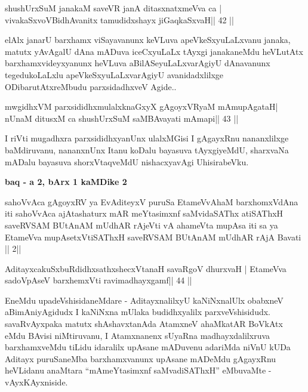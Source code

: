 \begin{shl}
shushUrxSuM janakaM saveVR janA ditasxnatxmeVva ca |
vivakaSxvoV\s BidhAvanitx tamudidxshayx jiGaqkaSxvaH\hfill || 42 ||
\end{shl}

\begin{artha}
elAlx janarU barxhamx viSayavanunx keVLuva apeVkeSxyuLaLxvanu janaka, matutx yAvAgalU dAna mADuva iceCxyuLaLx tAyxgi janakaneMdu heVLutAtx barxhamxvideyxyanunx heVLuva aBilASeyuLaLxvarAgiyU dAnavanunx tegedukoLaLxlu apeVkeSxyuLaLxvarAgiyU avanidadxlilxge ODibarutAtxreMbudu parxsidadhxveV Agide..
\end{artha}

\begin{shl}
mwgidhxVM parxsididhxmulalxknaGxyX gAgoyxVR\s yaM mAmupAgataH|
nUnaM ditusxM ca shushUrxSuM saMBAvayati mAmapi\hfill || 43 ||
\end{shl}

\begin{artha}
I riVti mugadhxra parxsididhxyanUnx ulalxMGisi I gAgayxRnu nananxlilxge baMdiruvanu, nananxnUnx Itanu koDalu bayasuva tAyxgiyeMdU, sharxvaNa mADalu bayasuva shorxVtaqveMdU nishacxyavAgi UhisirabeVku.
\end{artha}

\begin{center}
{\bf baq - a 2, bArx 1 kaMDike 2}
\end{center}

\begin{shl}
sahoVvAca gAgoyxRV ya EvA\s diteyxV puruSa
EtameVvAhaM barxhomxVdAna iti sahoVvAca
ajAtashaturx mAR meYtasimxnf saMvidaSAThx atiSAThxH
saveRVSAM BUtAnAM mUdhAR rAjeVti vA
ahameVta mupAsa iti sa ya EtameVva
mupAsetxV\s tiSAThxH saveRVSAM BUtAnAM mUdhAR
rAjA Bavati || 2||
\end{shl}


\begin{shl}
AditayxcakuSxbuRdidhxsathxshecxVtanaH savaRgoV dhurxvaH |
EtameVva sadoVpAseV barxhemxVti ravimadhayxgamf\hfill || 44 ||
\end{shl}

\begin{artha}
EneMdu upadeVshisidaneMdare - AditayxnalilxyU kaNiNxnalUlx obabxneV 
aBimAniyAgidudx I kaNiNxna mUlaka budidhxyalilx parxveVshisidudx. 
savaRvAyxpaka matutx shAshavxtanAda AtamxneV ahaMkatAR BoVkAtx eMdu 
BAvisi niMtiruvanu, I Atamxnanenx sUyaRna madhayxdalilxruva 
barxhamxveMdu tiLidu idaralilx upAsane mADuvenu adariMda niVnU kUDa 
Aditayx puruSaneMba barxhamxvanunx upAsane mADeMdu gAgayxRnu heVLidanu 
anaMtara ``mAmeYtasimxnf saMvadiSAThxH'' eMbuvaMte - vAyxKAyxniside.
\end{artha}

